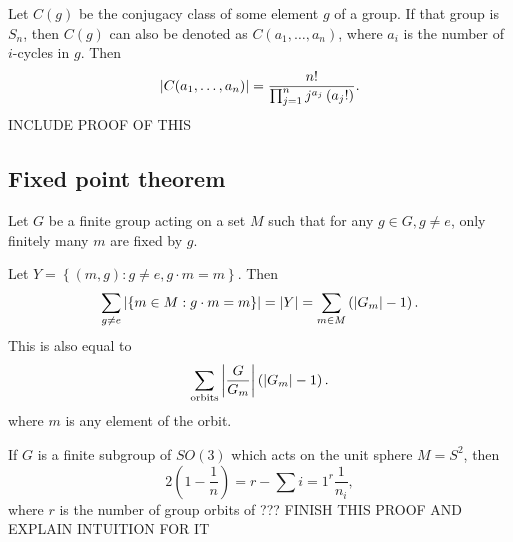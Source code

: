 \documentclass[class=article, crop=false]{standalone}
\begin{document}
\begin{prop}
    Let $C(g)$ be the conjugacy class of some element $g$ of a group. If that group is $S_n$, then $C(g)$ can also be denoted as $C(a_1,\dots,a_n)$, where $a_i$ is the number of $i$-cycles in $g$. Then
    \[ \left\lvert C(a_1,\dots,a_n) \right\rvert = \frac{n!}{\prod_{j=1}^n j^{a_j} \left( a_j! \right) }. \]
    INCLUDE PROOF OF THIS
\end{prop}

\subsection{Fixed point theorem}
Let $G$ be a finite group acting on a set $M$ such that for any $g \in G, g \neq e$, only finitely many $m$ are fixed by $g$.
\par
Let $Y = \left\{ (m,g): g \neq e, g \cdot m = m \right\}$. Then
\[ \sum_{g \neq e} \left\lvert  \left\{ m\in M:g \cdot m=m \right\} \right\rvert = \left\lvert Y \right\rvert = \sum_{m \in M} \left( \left\lvert G_m \right\rvert-1 \right) . \]
This is also equal to
\[ \sum_\text{orbits} \left\lvert  \frac{G}{G_m} \right\rvert \left( \left\lvert G_m \right\rvert-1 \right) . \]
where $m$ is any element of the orbit.
\begin{cor}
    If $G$ is a finite subgroup of $SO(3)$ which acts on the unit sphere $M=S^2$, then
    \[ 2 \left( 1 - \frac{1}{n} \right) = r - \sum{i=1}^r \frac{1}{n_i}, \]
    where $r$ is the number of group orbits of ???
    FINISH THIS PROOF AND EXPLAIN INTUITION FOR IT
\end{cor}
\end{document}
